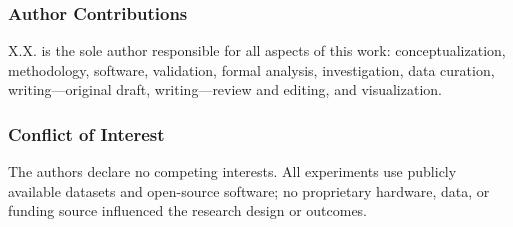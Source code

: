 \documentclass[runningheads]{llncs}
\begin{document}
\subsubsection*{Author Contributions}
X.X. is the sole author responsible for all aspects of this work: conceptualization, methodology, software, validation, formal analysis, investigation, data curation, writing---original draft, writing---review and editing, and visualization.

\subsubsection*{Conflict of Interest}
The authors declare no competing interests. All experiments use publicly available datasets and open-source software; no proprietary hardware, data, or funding source influenced the research design or outcomes.



\end{document}
